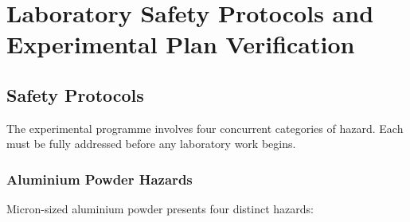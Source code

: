 \documentclass[12pt]{article}
\begin{document}
\appendix
\renewcommand{\thesection}{Appendix \Alph{section}:}
\renewcommand{\thesubsection}{\Alph{section}.\arabic{subsection}}
\renewcommand{\thesubsubsection}{\Alph{section}.\arabic{subsection}.\arabic{subsubsection}}
\section{Laboratory Safety Protocols and Experimental Plan Verification}

\subsection{Safety Protocols}
\label{app:safety-protocols}

The experimental programme involves four concurrent categories of hazard. Each must
be fully addressed before any laboratory work begins.

\subsubsection{Aluminium Powder Hazards}

Micron-sized aluminium powder presents four distinct hazards:
\end{document}

